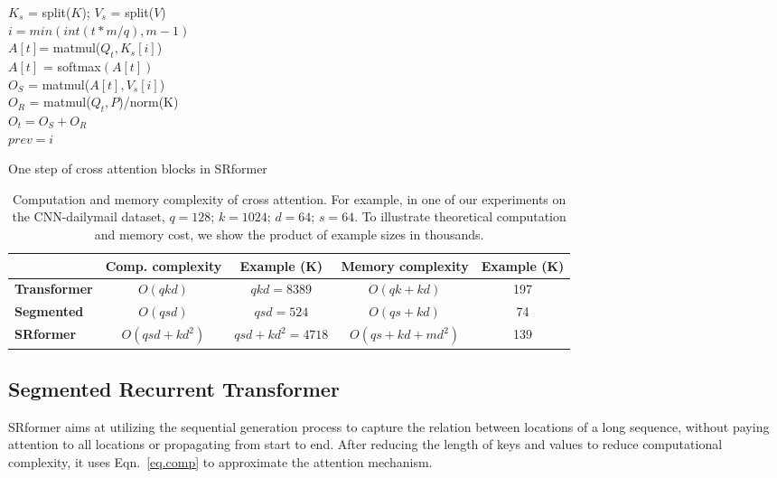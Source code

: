 \documentclass[11pt]{article}
\begin{document}
\begin{algorithm}[h]
\SetAlgoLined
{}
    $K_s$ = split($K$);    $V_s$ = split($V$)\\
    $i = min(int(t * m/q ), m-1)$ \\
    $A[t]$= matmul($Q_t, K_s[i]$)\\
    $A[t]$ = softmax$(A[t])$\\
    $O_S$ = matmul($A[t], V_s[i]$)\\
    $O_R$ = matmul($Q_t, P$)/norm(K)\\
    $O_t= O_S + O_R$\\
    $prev = i$
 \caption{One step of cross attention blocks in SRformer \label{algorithm1}}
\end{algorithm}

\begin{table*}
\begin{tabular}{l|cc|cc}
\hline
&   \textbf{Comp. complexity} & \textbf{Example (K)} & \textbf{Memory complexity}& \textbf{Example (K)}  \\
\hline
\textbf{Transformer}  & $O(qkd)$ &  $qkd=8389$ & $O(qk+kd)$ & 197\\
\textbf{Segmented} & $O(qsd)$& $qsd=524$ & $O(qs+kd)$ & 74\\
\textbf{SRformer} & $O(qsd + kd^2)$ & $qsd + kd^2= 4718$ & $O(qs+kd+md^2)$ & 139\\
\hline
\end{tabular}
\caption{ Computation and memory complexity of cross attention. For example, in one of our experiments on the CNN-dailymail dataset, $q=128$; $k=1024$; $d=64$; $s=64$. To illustrate theoretical computation and memory cost, we show the product of example sizes in thousands.}
\label{complexity}
\end{table*}
\subsection{Segmented Recurrent Transformer}
SRformer aims at utilizing the sequential generation process to capture the relation between locations of a long sequence, without paying attention to all locations or propagating from start to end.
After reducing the length of keys and values to reduce computational complexity, it uses Eqn.~\ref{eq.comp} to approximate the attention mechanism.
\end{document}
